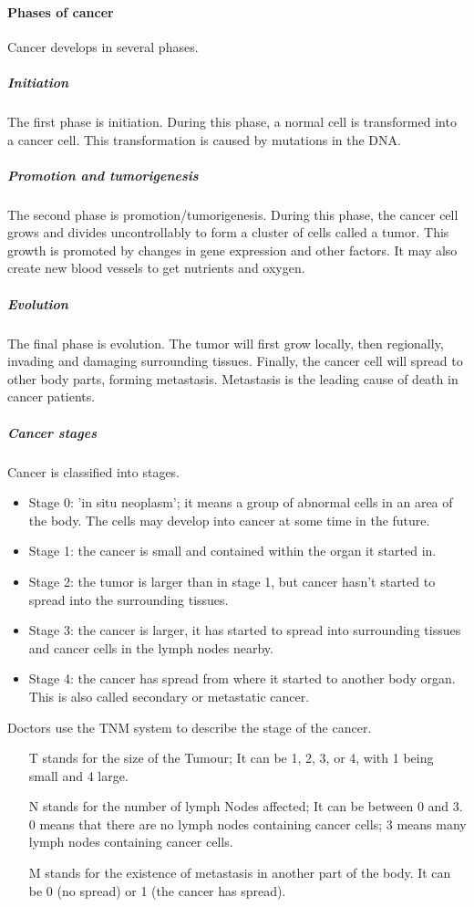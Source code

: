 \paragraph{Phases of cancer}
Cancer develops in several phases.
\subparagraph{Initiation}
The first phase is initiation.
During this phase, a normal cell is transformed into a cancer cell.
This transformation is caused by mutations in the DNA.
\subparagraph{Promotion and tumorigenesis}
The second phase is promotion/tumorigenesis.
During this phase, the cancer cell grows and divides uncontrollably to form a cluster of cells called a tumor.
This growth is promoted by changes in gene expression and other factors\cite{Witsch2010}.
It may also create new blood vessels to get nutrients and oxygen.
\subparagraph{Evolution}
The final phase is evolution.
The tumor will first grow locally, then regionally, invading and damaging surrounding tissues.
Finally, the cancer cell will spread to other body parts, forming metastasis.
Metastasis is the leading cause of death in cancer patients\cite{Steeg2006}.

\subparagraph{Cancer stages}
Cancer is classified into stages\cite{cancerresearchuk2023}.
\begin{itemize}
	\item Stage 0: 'in situ neoplasm'; it means a group of abnormal cells in an area of the body. The cells may develop into cancer at some time in the future.
	\item Stage 1: the cancer is small and contained within the organ it started in.
	\item Stage 2: the tumor is larger than in stage 1, but cancer hasn't started to spread into the surrounding tissues.
	\item Stage 3: the cancer is larger, it has started to spread into surrounding tissues and cancer cells in the lymph nodes nearby.
	\item Stage 4: the cancer has spread from where it started to another body organ. This is also called secondary or metastatic cancer.
\end{itemize}
Doctors use the TNM system to describe the stage of the cancer\cite{Brierley2016}.
\begin{itemize}
	\item [T] stands for the size of the Tumour;
	It can be 1, 2, 3, or 4, with 1 being small and 4 large.
	\item [N] stands for the number of lymph Nodes affected;
	It can be between 0 and 3.
	0 means that there are no lymph nodes containing cancer cells; 3 means many lymph nodes containing cancer cells.
	\item [M] stands for the existence of metastasis in another part of the body.
	It can be 0 (no spread) or 1 (the cancer has spread).
\end{itemize}

